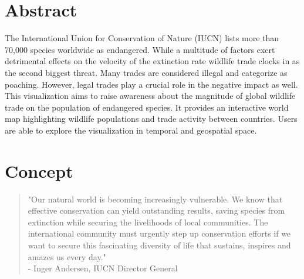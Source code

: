 \section{Abstract}
The International Union for Conservation of Nature (IUCN) lists more than 70,000 species worldwide as endangered.
While a multitude of factors exert detrimental effects on the velocity of the extinction rate wildlife trade clocks in as the second biggest threat.
Many trades are considered illegal and categorize as poaching.
However, legal trades play a crucial role in the negative impact as well.
This visualization aims to raise awareness about the magnitude of global wildlife trade on the population of endangered species. It provides an interactive world map highlighting wildlife populations and trade activity between countries. Users are able to explore the visualization in temporal and geospatial space.

\section{Concept}
\begin{quote}
"Our natural world is becoming increasingly vulnerable. We
know that effective conservation can yield outstanding
results, saving species from extinction while securing
the livelihoods of local communities. The international
community must urgently step up conservation efforts
if we want to secure this fascinating diversity of life
that sustains, inspires and amazes us every day." \\
- Inger Andersen, IUCN Director General \cite{Mauverney2012}
\end{quote}


